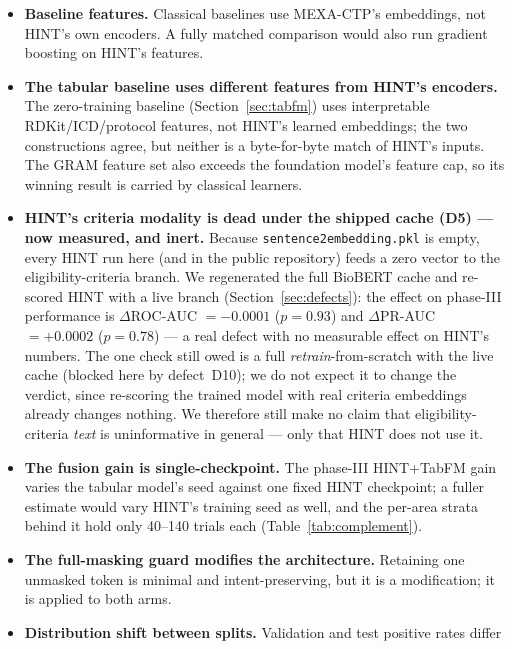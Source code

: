\documentclass[a4paper,fleqn]{cas-sc}
\begin{document}
\begin{itemize}
        per-window sampling noise, so a multi-cut re-split is the proper measurement, left to future work.
  \item \textbf{Baseline features.} Classical baselines use MEXA-CTP's embeddings, not
        HINT's own encoders. A fully matched comparison would also run gradient boosting on
        HINT's features.
  \item \textbf{The tabular baseline uses different features from HINT's encoders.} The
        zero-training baseline (Section~\ref{sec:tabfm}) uses interpretable RDKit/ICD/protocol
        features, not HINT's learned embeddings; the two constructions agree, but neither is a
        byte-for-byte match of HINT's inputs. The GRAM feature set also exceeds the foundation
        model's feature cap, so its winning result is carried by classical learners.
  \item \textbf{HINT's criteria modality is dead under the shipped cache (D5) --- now measured,
        and inert.} Because \texttt{sentence2embedding.pkl} is empty, every HINT run here (and in
        the public repository) feeds a zero vector to the eligibility-criteria branch. We
        regenerated the full BioBERT cache and re-scored HINT with a live branch
        (Section~\ref{sec:defects}): the effect on phase-III performance is $\Delta$ROC-AUC
        $=-0.0001$ ($p=0.93$) and $\Delta$PR-AUC $=+0.0002$ ($p=0.78$) --- a real defect with no
        measurable effect on HINT's numbers. The one check still owed is a full
        \emph{retrain}-from-scratch with the live cache (blocked here by defect~D10); we do not
        expect it to change the verdict, since re-scoring the trained model with real criteria
        embeddings already changes nothing. We therefore still make no claim that
        eligibility-criteria \emph{text} is uninformative in general --- only that HINT does not
        use it.
  \item \textbf{The fusion gain is single-checkpoint.} The phase-III HINT+TabFM gain varies
        the tabular model's seed against one fixed HINT checkpoint; a fuller estimate would
        vary HINT's training seed as well, and the per-area strata behind it hold only
        40--140 trials each (Table~\ref{tab:complement}).
  \item \textbf{The full-masking guard modifies the architecture.} Retaining one unmasked
        token is minimal and intent-preserving, but it is a modification; it is applied to
        both arms.
  \item \textbf{Distribution shift between splits.} Validation and test positive rates differ

\end{itemize}
\end{document}
